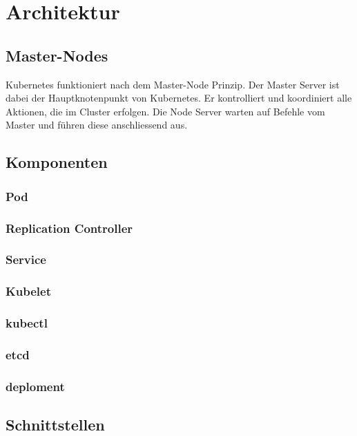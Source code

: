 \section{Architektur}
\subsection{Master-Nodes}
Kubernetes funktioniert nach dem Master-Node Prinzip.
Der Master Server ist dabei der Hauptknotenpunkt von Kubernetes. Er kontrolliert und koordiniert alle Aktionen, die im Cluster erfolgen. Die Node Server warten auf Befehle vom Master und führen diese anschliessend aus.

\subsection{Komponenten}
\subsubsection{Pod}
\subsubsection{Replication Controller}
\subsubsection{Service}
\subsubsection{Kubelet}
\subsubsection{kubectl}
\subsubsection{etcd}
\subsubsection{deploment}
\subsection{Schnittstellen}
\clearpage